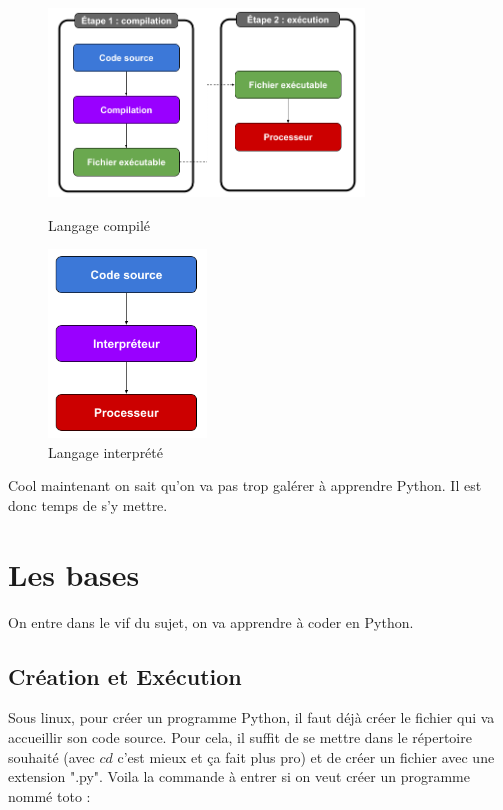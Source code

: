\documentclass[a4paper,12pt]{article}
\begin{document}
\begin{figure}[h]
    \centering
    \begin{minipage}{0.45\textwidth}
        \centering
        \includegraphics[height=5cm]{../images/compile.png}
        \caption{Langage compilé}
    \end{minipage}
    \hfill
    \begin{minipage}{0.45\textwidth}
        \centering
        \includegraphics[height=5cm]{../images/interprete.png}
        \caption{Langage interprété}
    \end{minipage}
\end{figure}

Cool maintenant on sait qu'on va pas trop galérer à apprendre Python. Il est donc temps de s'y mettre.

\newpage

\section{Les bases}

On entre dans le vif du sujet, on va apprendre à coder en Python. 

\subsection{Création et Exécution}

Sous linux, pour créer un programme Python, il faut déjà créer le fichier qui va accueillir son code source. \newline
Pour cela, il suffit de se mettre dans le répertoire souhaité (avec $cd$ c'est mieux et ça fait plus pro) et de créer un fichier avec une extension ".py".
Voila la commande à entrer si on veut créer un programme nommé toto :
\end{document}
